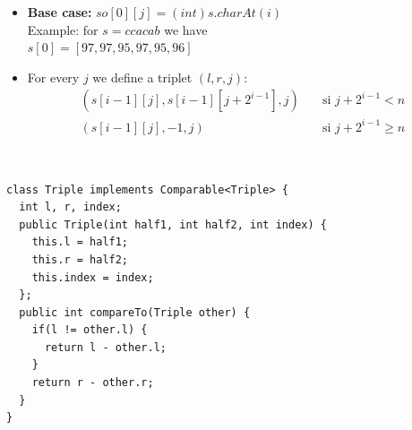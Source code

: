 \begin{itemize}

\item\textbf{Base case: }$so[0][j] = (int)s.charAt(i) $\\
Example: for $s = ccacab$ we have \\$ s[0] = [97, 97, 95, 97, 95, 96]$
\item For every $j$ we define a triplet $(l, r, j)$:
\begin{align*}
(s[i - 1][j], s[i - 1][j + 2^{i - 1}], j) & \quad \text{si $j + 2^{i - 1} < n$} \\
(s[i - 1][j], -1, j) & \quad \text{si $j + 2^{i - 1} \geq n$}
\end{align*}

\end{itemize}
\ \newline
\begin{lstlisting}
class Triple implements Comparable<Triple> {
  int l, r, index;
  public Triple(int half1, int half2, int index) {
    this.l = half1;
    this.r = half2;
    this.index = index;
  };
  public int compareTo(Triple other) {
    if(l != other.l) {
      return l - other.l;
    }
    return r - other.r;
  }
} 
\end{lstlisting}
\ \newline
